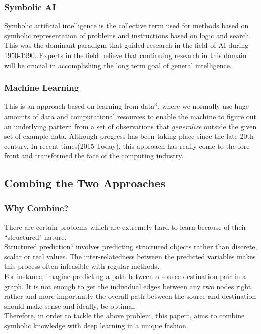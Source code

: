 \documentclass[12pt]{article}
\begin{document}
\subsubsection{Symbolic AI}
Symbolic artificial intelligence is the collective term used for methods based on symbolic representation of problems and instructions based on logic and search. This was the dominant paradigm that guided research in the field of AI during 1950-1990. Experts in the field believe that continuing research in this domain will be crucial in accomplishing the long term goal of general intelligence. 
\subsubsection{Machine Learning}
This is an approach based on learning from data\begin{math}^3\end{math}, where we normally use huge amounts of data and computational resources to enable the machine to figure out an underlying pattern from a set of observations that \textit{generalize} outside the given set of example-data. Although progress has been taking place since the late 20th century, In recent times(2015-Today), this approach has really come to the fore-front and transformed the face of the computing industry.

\subsection{Combing the Two Approaches}

\subsubsection{Why Combine?}
There are certain problems which are extremely hard to learn because of their ``structured" nature.\\ 
Structured prediction\begin{math}^4\end{math} involves predicting structured objects rather than discrete, scalar or real values. The inter-relatedness between the predicted variables makes this process often infeasible with regular methods.\\ 
For instance, imagine predicting a path between a source-destination pair in a graph. It is not enough to get the individual edges between any two nodes right, rather and more importantly the overall path between the source and destination should make sense and ideally, be optimal.\\   
Therefore, in order to tackle the above problem, this paper\begin{math}^1\end{math}, aims to combine symbolic knowledge with deep learning in a unique fashion. 
\end{document}
